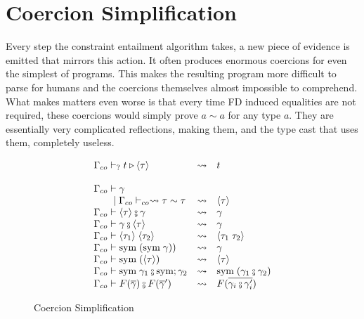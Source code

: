 \chapter{Coercion Simplification}
\label{cha:co-simpl}

Every step the constraint entailment algorithm takes, a new piece of evidence is
emitted that mirrors this action. It often produces enormous coercions for even
the simplest of programs. This makes the resulting program more difficult to
parse for humans and the coercions themselves almost impossible to comprehend.
What makes matters even worse is that every time FD induced equalities are not
required, these coercions would simply prove $a \sim a$ for any type $a$. They
are essentially very complicated reflections, making them, and the type cast
that uses them, completely useless.

\begin{figure}
\[
\begin{array}{l c l}
\Gamma_{co} \vdash_{?} t \triangleright \langle \tau \rangle &\rightsquigarrow& t\\
\\
\Gamma_{co} \vdash \gamma \\
\guard \Gamma_{co} \vdash_{co} \rightsquigarrow \tau \sim \tau &\rightsquigarrow& \langle \tau
\rangle
\\
\Gamma_{co} \vdash \langle \tau \rangle \fctrans \gamma &\rightsquigarrow& \gamma
\\
\Gamma_{co} \vdash \gamma \fctrans \langle \tau \rangle &\rightsquigarrow& \gamma
\\
\Gamma_{co} \vdash \langle \tau_1 \rangle \; \langle \tau_2 \rangle
&\rightsquigarrow& \langle \tau_1 \; \tau_2 \rangle
\\
\Gamma_{co} \vdash \text{sym} \; (\text{sym} \; \gamma)) &\rightsquigarrow& \gamma
\\
\Gamma_{co} \vdash \text{sym} \; (\langle \tau \rangle) &\rightsquigarrow& \langle \tau \rangle
\\
\Gamma_{co} \vdash \text{sym} \; \gamma_1 \fctrans \text{sym} ; \gamma_2
&\rightsquigarrow& \text{sym} \; (\gamma_1 \fctrans \gamma_2)
\\
\Gamma_{co} \vdash F(\overline{\gamma}) \fctrans F(\overline{\gamma}')
&\rightsquigarrow& F(\overline{\gamma_i \fctrans \gamma_i'})
\end{array}
\]
\caption{Coercion Simplification}
\label{fig:co-simpl}
\end{figure}

